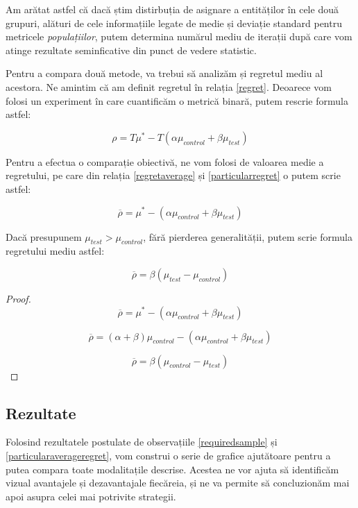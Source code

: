 Am arătat astfel că dacă știm distirbuția de asignare a entităților în cele două grupuri, alături de cele informațiile legate de medie și deviație standard pentru metricele \textit{populațiilor}, putem determina numărul mediu de iterații după care vom atinge rezultate seminficative din punct de vedere statistic.

Pentru a compara două metode, va trebui să analizăm și regretul mediu al acestora. Ne amintim că am definit regretul în relația \ref{regret}. Deoarece vom folosi un experiment în care cuantificăm o metrică binară, putem rescrie formula astfel:

\begin{equation}
\label{particularregret}
	\rho = T \mu^* - T(\alpha \mu_{control}  +  \beta \mu_{test})
\end{equation}

Pentru a efectua o comparație obiectivă, ne vom folosi de valoarea medie a regretului, pe care din relația \ref{regretaverage} și \ref{particularregret} o putem scrie astfel: 

\begin{equation}
\label{particularregretaverage}
	\overline{\rho} = \mu^* - (\alpha \mu_{control}  +  \beta  \mu_{test})
\end{equation}

\begin{remark}
\label{particularaverageregret}
	Dacă presupunem $\mu_{test} > \mu_{control}$, fără pierderea generalității, putem scrie formula regretului mediu astfel:
	
	\[
		\overline{\rho} = \beta (\mu_{test} - \mu_{control})
	\]
\end{remark}

\begin{proof}
	
	\[
		\overline{\rho} = \mu^* - (\alpha \mu_{control}  +  \beta  \mu_{test})
	\]
	
	\[
	\overline{\rho} = (\alpha + \beta)\mu_{control} - (\alpha \mu_{control}  +  \beta  \mu_{test})
	\]
	
	\[
	\overline{\rho} = \beta (\mu_{control} - \mu_{test})
	\]
\end{proof}

\subsection{Rezultate}

Folosind rezultatele postulate de observațiile \ref{requiredsample}  și \ref{particularaverageregret}, vom construi o serie de grafice ajutătoare pentru a putea compara toate modalitațile descrise. Acestea ne vor ajuta să identificăm vizual avantajele și dezavantajale fiecăreia, și ne va permite să concluzionăm mai apoi asupra celei mai potrivite strategii.

